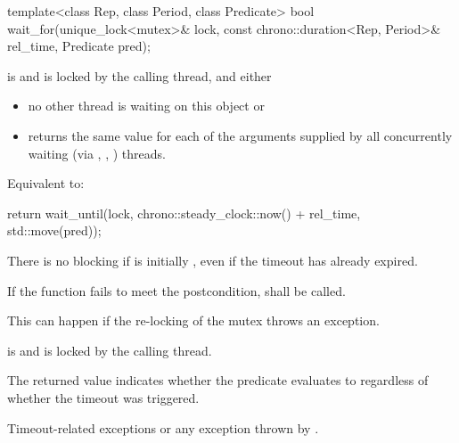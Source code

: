 %
\begin{itemdecl}
template<class Rep, class Period, class Predicate>
  bool wait_for(unique_lock<mutex>& lock,
                const chrono::duration<Rep, Period>& rel_time,
                Predicate pred);
\end{itemdecl}
\begin{itemdescr}
 \pnum \requires {} is  and 
        is locked by the calling thread, and either
        \begin{itemize}
        \item no other thread is waiting on this  object or
        \item {} returns the same value for each of the  arguments
                supplied by all concurrently waiting (via ,
                , ) threads.
        \end{itemize}
 
 \pnum \effects Equivalent to:
\begin{codeblock}
return wait_until(lock, chrono::steady_clock::now() + rel_time, std::move(pred));
\end{codeblock}
 
 \pnum \begin{note} There is no blocking if  is initially , even if the
        timeout has already expired. \end{note}
 
 \pnum \remarks
        If the function fails to meet the postcondition, 
        shall be called.
        \begin{note} This can happen if the re-locking of the mutex throws an exception. \end{note}
 
 \pnum \postconditions {} is  and 
        is locked by the calling thread.
 
 \pnum \begin{note} The returned value indicates whether the predicate evaluates to 
        regardless of whether the timeout was triggered. \end{note}
 
 \pnum \throws Timeout-related exceptions or any exception thrown by .
\end{itemdescr}



